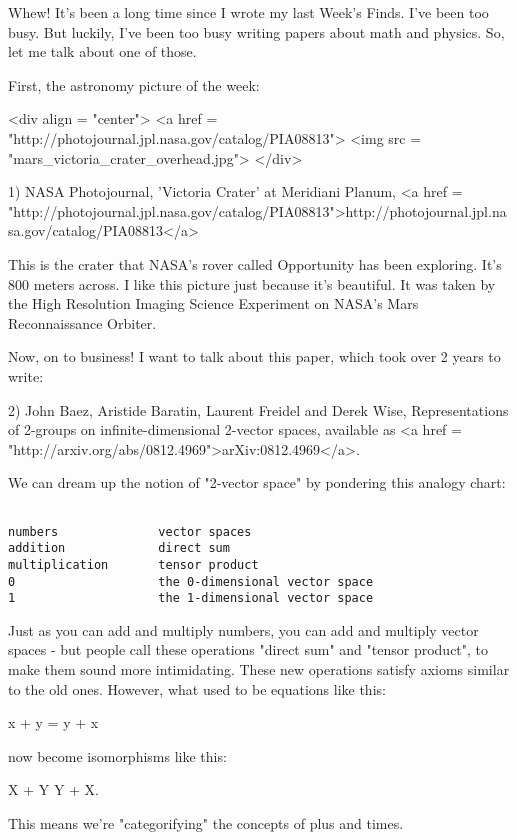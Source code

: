 


Whew!  It's been a long time since I wrote my last Week's Finds.
I've been too busy.  But luckily, I've been too busy writing papers 
about math and physics.  So, let me talk about one of those.  

First, the astronomy picture of the week:

<div align = "center">
<a href = "http://photojournal.jpl.nasa.gov/catalog/PIA08813">
<img src = "mars_victoria_crater_overhead.jpg">
</div>

1) NASA Photojournal, 'Victoria Crater' at Meridiani Planum,
<a href = "http://photojournal.jpl.nasa.gov/catalog/PIA08813">http://photojournal.jpl.nasa.gov/catalog/PIA08813</a>

This is the crater that NASA's rover called Opportunity has been
exploring.  It's 800 meters across.  I like this picture just 
because it's beautiful.  It was taken by the High Resolution 
Imaging Science Experiment on NASA's Mars Reconnaissance Orbiter. 

Now, on to business!  I want to talk about this paper, which
took over 2 years to write:

2) John Baez, Aristide Baratin, Laurent Freidel and Derek Wise,
Representations of 2-groups on infinite-dimensional 2-vector spaces,
available as <a href = "http://arxiv.org/abs/0812.4969">arXiv:0812.4969</a>.

We can dream up the notion of "2-vector space" by pondering
this analogy chart:


\begin{verbatim}

numbers              vector spaces
addition             direct sum
multiplication       tensor product       
0                    the 0-dimensional vector space
1                    the 1-dimensional vector space
\end{verbatim}
    

Just as you can add and multiply numbers, you can add and multiply
vector spaces - but people call these operations "direct sum" and
"tensor product", to make them sound more intimidating.  These new
operations satisfy axioms similar to the old ones.  However, what 
used to be equations like this:

x + y = y + x

now become isomorphisms like this:

X + Y \cong  Y + X.

This means we're "categorifying" the concepts of plus and times.

